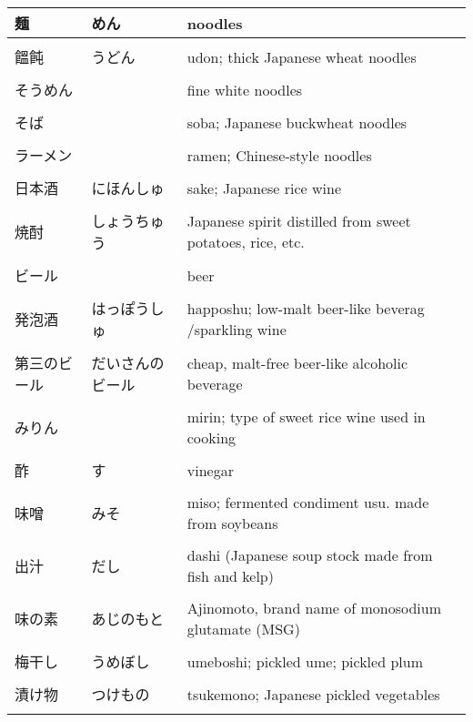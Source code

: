 \documentclass{article}
\begin{document}
\begin{tabular}{ l | l | p{11.5cm} }
麺              &めん                           &noodles \\ \hline \\[-1em]
饂飩            &うどん                         &udon; thick Japanese wheat noodles \\ \hline \\[-1em]
そうめん        &                               &fine white noodles \\ \hline \\[-1em]
そば            &                               &soba; Japanese buckwheat noodles \\ \hline \\[-1em]
ラーメン        &                               &ramen; Chinese-style noodles \\ \hline \\[-1em]
日本酒          &にほんしゅ                     &sake; Japanese rice wine \\ \hline \\[-1em]
焼酎            &しょうちゅう                   &Japanese spirit distilled from sweet potatoes, rice, etc.   \\ \hline \\[-1em]
ビール          &                               &beer \\ \hline \\[-1em]
発泡酒          &はっぽうしゅ                   &happoshu; low-malt beer-like beverag /sparkling wine \\ \hline \\[-1em]
第三のビール    &だいさんのビール               &cheap, malt-free beer-like alcoholic beverage \\ \hline \\[-1em]
みりん          &                               &mirin; type of sweet rice wine used in cooking \\ \hline \\[-1em]
酢              &す                             &vinegar \\ \hline \\[-1em]
味噌            &みそ                           &miso; fermented condiment usu. made from soybeans  \\ \hline \\[-1em]
出汁            &だし                           &dashi (Japanese soup stock made from fish and kelp) \\ \hline \\[-1em]
味の素          &あじのもと                     &Ajinomoto, brand name of monosodium glutamate (MSG) \\ \hline \\[-1em]
梅干し          &うめぼし                       &umeboshi; pickled ume; pickled plum  \\ \hline \\[-1em]
漬け物          &つけもの                       &tsukemono; Japanese pickled vegetables  \\ \hline \\[-1em]
\end{tabular}
\end{document}
